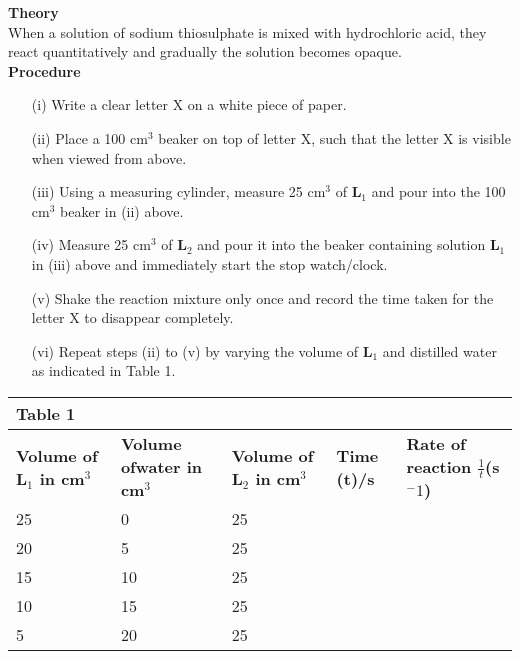 \begin{enumerate}
\textbf{Theory}\\
When a solution of sodium thiosulphate is mixed with hydrochloric acid, they react quantitatively and gradually the solution becomes opaque.\\[10pt]

\textbf{Procedure}\\
\begin{enumerate}
\item[(i)] Write a clear letter X on a white piece of paper.
\item[(ii)] Place a 100 cm$^3$ beaker on top of letter X, such that the letter X is visible when viewed from above.
\item[(iii)] Using a measuring cylinder, measure 25 cm$^3$ of \textbf{L$_1$} and pour into the 100 cm$^3$ beaker in (ii) above.
\item[(iv)] Measure 25 cm$^3$ of \textbf{L$_2$} and pour it into the beaker containing solution \textbf{L$_1$} in (iii) above and immediately start the stop watch/clock.
\item[(v)] Shake the reaction mixture only once and record the time taken for the letter X to disappear completely.
\item[(vi)] Repeat steps (ii) to (v) by varying the volume of \textbf{L$_1$} and distilled water as indicated in Table 1.
\end{enumerate}

\newpage

\begin{center}
\begin{tabular}{|p{2.5cm}|p{2.5cm}|p{2.5cm}|p{2cm}|p{4cm}|}
\multicolumn{1}{l}{Table 1}&\multicolumn{1}{l}{ }&\multicolumn{1}{l}{ }\\ \hline
\textbf{Volume of \textbf{L$_1$} in cm$^3$}&\textbf{Volume of\newline water in cm$^3$}&\textbf{Volume of \textbf{L$_2$} in cm$^3$}&\textbf{Time (t)/s}&\textbf{Rate of reaction $\frac{1}{t}$(s$^-1$)}\\ \hline
25&0&25&&\\ \hline
20&5&25&&\\ \hline
15&10&25&&\\ \hline
10&15&25&&\\ \hline
5&20&25&&\\ \hline
\end{tabular}
\end{center}


\end{enumerate}
